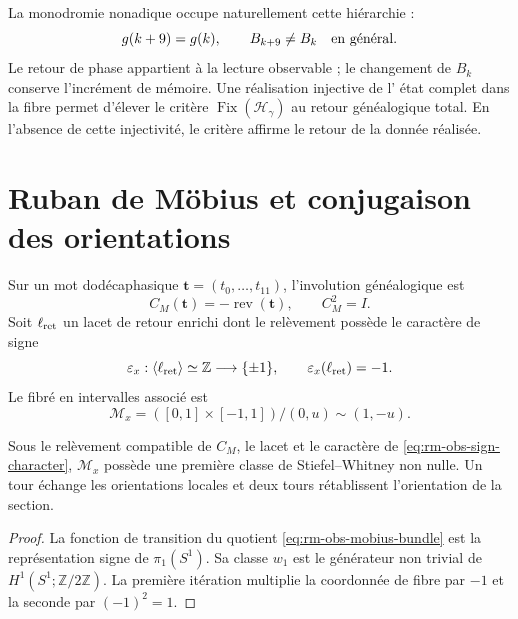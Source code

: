 La monodromie nonadique occupe naturellement cette hiérarchie :
\begin{equation}
 g(k+9)=g(k),
 \qquad
 B_{k+9}\neq B_k\quad\hbox{en général}.
 \label{eq:rm-obs-phase-state-return}
\end{equation}
Le retour de phase appartient à la lecture observable ; le changement de
\(B_k\) conserve l'incrément de mémoire. Une réalisation injective de l'
état complet dans la fibre permet d'élever le critère
\(\operatorname{Fix}(\mathscr H_\gamma)\) au retour généalogique total.
En l'absence de cette injectivité, le critère affirme le retour de la donnée
réalisée.

\section{Ruban de Möbius et conjugaison des orientations}

Sur un mot dodécaphasique
\(\mathbf t=(t_0,\ldots,t_{11})\), l'involution généalogique est
\begin{equation}
 C_M(\mathbf t)=-\operatorname{rev}(\mathbf t),
 \qquad
 C_M^2=I.
 \label{eq:rm-obs-word-involution}
\end{equation}
Soit \(\ell_{\rm ret}\) un lacet de retour enrichi dont le relèvement
possède le caractère de signe
\begin{equation}
 \varepsilon_x:\langle\ell_{\rm ret}\rangle\simeq\mathbb Z
 \longrightarrow\{\pm1\},
 \qquad
 \varepsilon_x(\ell_{\rm ret})=-1.
 \label{eq:rm-obs-sign-character}
\end{equation}
Le fibré en intervalles associé est
\begin{equation}
 \mathcal M_x
 =([0,1]\times[-1,1])/(0,u)\sim(1,-u).
 \label{eq:rm-obs-mobius-bundle}
\end{equation}

\begin{theorem}
\label{thm:rm-obs-mobius-return}
Sous le relèvement compatible de \(C_M\), le lacet et le caractère de
\cref{eq:rm-obs-sign-character}, \(\mathcal M_x\) possède une première classe de
Stiefel--Whitney non nulle. Un tour échange les orientations locales et
deux tours rétablissent l'orientation de la section.
\end{theorem}

\begin{proof}
La fonction de transition du quotient
\cref{eq:rm-obs-mobius-bundle} est la représentation signe de
\(\pi_1(S^1)\). Sa classe \(w_1\) est le générateur non trivial de
\(H^1(S^1;\mathbb Z/2\mathbb Z)\). La première itération multiplie la
coordonnée de fibre par \(-1\) et la seconde par \((-1)^2=1\).
\end{proof}

